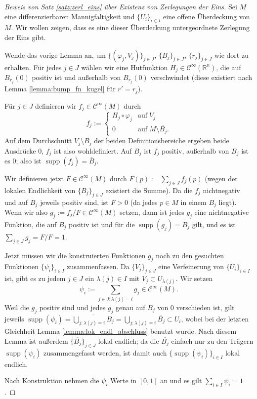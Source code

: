 \documentclass[a4paper]{scrreprt}
\numberwithin{equation}{chapter}
\DeclareMathOperator{\supp}{supp}
\newcommand{\R}{\mathbb{R}}
\newcommand{\sC}{\mathcal{C}^{\infty}}
\theoremstyle{definition}
\begin{document}
\begin{proof}[Beweis von Satz \ref{satz:zerl_eins} über Existenz von Zerlegungen der Eins]
	Sei $M$ eine differenzierbaren Mannigfaltigkeit und $\{U_i\}_{i\in I}$ eine offene Überdeckung von $M$. Wir wollen zeigen, dass es eine dieser Überdeckung untergeordnete Zerlegung der Eins gibt.

	Wende das vorige Lemma an, um $\{(\varphi_j,V_j)\}_{j\in J}$, $\{B_j\}_{j\in J}$, $\{r_j\}_{j\in J}$ wie dort zu erhalten. Für jedes $j\in J$ wählen wir eine Hutfunktion $H_j \in \sC(\R^n)$, die auf $B_{r_j}(0)$ positiv ist und außerhalb von $B_{r_j}(0)$ verschwindet (diese existiert nach Lemma \ref{lemma:bump_fn_kugel} für $r' = r_j$).

	Für $j\in J$ definieren wir $f_j \in \sC(M)$ durch
	\[f_j := \begin{cases}
	H_j \circ \varphi_j & \text{auf} \; V_j\\
	0 & \text{auf} \; M \setminus \overline{B_j}.
	\end{cases}\]
	Auf dem Durchschnitt $V_j \setminus \overline{B_j}$ der beiden Definitionsbereiche ergeben beide Ausdrücke 0, $f_j$ ist also wohldefiniert. Auf $B_j$ ist $f_j$ positiv, außerhalb von $B_j$ ist es 0; also ist $\supp(f_j) = \bar B_j$.

	Wir definieren jetzt $F \in \sC(M)$ durch $F(p) := \sum_{j\in J} f_j(p)$ (wegen der lokalen Endlichkeit von $\{B_j\}_{j\in J}$ existiert die Summe). Da die $f_j$ nichtnegativ und auf $B_j$  jeweils positiv sind, ist $F > 0$ (da jedes $p\in M$ in einem $B_j$ liegt). Wenn wir also $g_j := f_j / F \in \sC(M)$ setzen, dann ist jedes $g_j$ eine nichtnegative Funktion, die auf $B_j$ positiv ist und für die $\supp(g_j) = \bar B_j$ gilt, und es ist $\sum_{j \in J} g_j = F/F = 1$.

	Jetzt müssen wir die konstruierten Funktionen $g_j$ noch zu den gesuchten Funktionen $\{\psi_i\}_{i\in I}$ zusammenfassen. Da $\{V_j\}_{j\in J}$ eine Verfeinerung von $\{U_i\}_{i\in I}$ ist, gibt es zu jedem $j \in J$ ein $\lambda(j) \in I$ mit $V_j \subset U_{\lambda(j)}$. Wir setzen
	\[\psi_i := \sum_{j\in J: \lambda(j) = i} g_j \in \sC(M).\]
	Weil die $g_j$ positiv sind und jedes $g_j$ genau auf $B_j$ von 0 verschieden ist, gilt jeweils $\supp(\psi_i) = \overline{\bigcup_{j: \lambda(j) = i} B_j} = \bigcup_{j: \lambda(j) = i} \overline{B_j} \subset U_i$, wobei bei der letzten Gleichheit Lemma \ref{lemma:lok_endl_abschluss} benutzt wurde. Nach diesem Lemma ist außerdem $\{\overline{B_j}\}_{j\in J}$ lokal endlich; da die $\overline{B_j}$ einfach nur zu den Trägern $\supp(\psi_i)$ \glqq zusammengefasst werden\grqq, ist damit auch $\{\supp(\psi_i)\}_{i\in I}$ lokal endlich.

	Nach Konstruktion nehmen die $\psi_i$ Werte in $[0,1]$ an und es gilt $\sum_{i\in I} \psi_i = 1$.
\end{proof}
\end{document}
